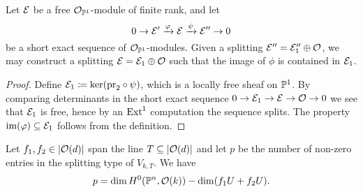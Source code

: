 \begin{lemma} \label{mini-splitting-lemma}
	Let $\mathcal{E}$ be a free $\mathcal{O}_{\mathbb{P}^1}$-module of finite rank, and let 
	\[
		0 \to \mathcal{E}' \xrightarrow{\varphi} \mathcal{E} \xrightarrow{\psi} \mathcal{E}'' \to 0
 	\]
 	be a short exact sequence of $\mathcal{O}_{\mathbb{P}^1}$-modules. Given a splitting $\mathcal{E}'' = \mathcal{E}''_1 \oplus \mathcal{O}$, we may construct a splitting $\mathcal{E} = \mathcal{E}_1 \oplus \mathcal{O}$ such that the image of $\phi$ is contained in $\mathcal{E}_1$.
\end{lemma}

\begin{proof}
	Define $\mathcal{E}_1 \coloneqq \ker(\mathrm{pr}_2\circ\psi)$, which is a locally free sheaf on $\mathbb{P}^1$. By comparing determinants in the short exact sequence $0 \to \mathcal{E}_1 \to \mathcal{E} \to \mathcal{O} \to 0$ we see that $\mathcal{E}_1$ is free, hence by an $\operatorname{Ext}^1$ computation the sequence splits. The property $\operatorname{im}(\varphi) \subseteq \mathcal{E}_1$ follows from the definition.
\end{proof}

\begin{proposition} \label{number-zeroes}
	Let $f_1, f_2 \in \lvert\mathcal{O}(d)\rvert$ span the line
	$T \subseteq \lvert\mathcal{O}(d)\rvert$ and let $p$ be the 
	number of non-zero entries in the splitting type of $V_{k,T}$. We have
	\[
	p = \dim H^0(\mathbb{P}^n,\mathcal{O}(k)) - \dim ({f_1 U + f_2 U}).
	\]

\end{proposition}

